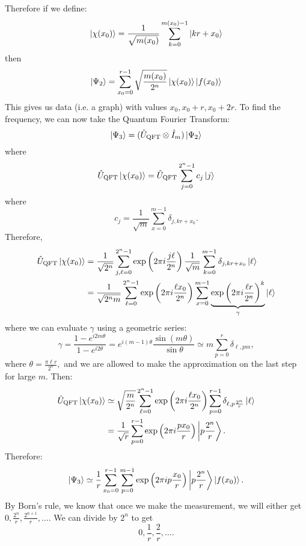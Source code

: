 \documentclass{article}
\numberwithin{equation}{section}
\begin{document}
Therefore if we define:
\begin{equation}
    \ket{\chi(x_0)} = \frac{1}{\sqrt{m(x_0)}} \sum_{k=0}^{m(x_0)-1}\ket{kr+x_0}
\end{equation}
then
\begin{equation}
    \ket{\Psi_2} = \sum_{x_0=0}^{r-1}\sqrt{\frac{m(x_0)}{2^n}}\ket{\chi(x_0)}\ket{f(x_0)}
\end{equation}
This gives us data (i.e. a graph) with values $x_0,x_0+r, x_0+2r.$ To find the frequency, we can now take the Quantum Fourier Transform:
\begin{equation}
    \ket{\Psi_3} = (\hat{U}_\text{QFT} \otimes \hat{I}_m)\ket{\Psi_2}
\end{equation}
where 
\begin{equation}
    \hat{U}_\text{QFT}\ket{\chi(x_0)} = \hat{U}_\text{QFT} \sum_{j=0}^{2^n-1} c_j \ket{j}
\end{equation}
where 
\begin{equation}
    c_j = \frac{1}{\sqrt{m}}\sum_{x=0}^{m-1} \delta_{j,kr+x_0}.
\end{equation}
Therefore,
\begin{align}
    \hat{U}_\text{QFT}\ket{\chi(x_0)} &= \frac{1}{\sqrt{2^n}} \sum_{j,\ell=0}^{2^n-1} \exp\left(2\pi i \frac{j\ell}{2^n}\right)\frac{1}{\sqrt{m}}\sum_{k=0}^{m-1} \delta_{j,kr+x_0}\ket{\ell} \\ 
    &= \frac{1}{\sqrt{2^nm}} \sum_{\ell=0}^{2^n-1} \exp\left(2\pi i \frac{\ell x_0}{2^n}\right)\sum_{x=0}^{m-1} \underbrace{\exp\left(2\pi i \frac{\ell r}{2^n}\right)^k}_{\gamma}\ket{\ell}
\end{align}
where we can evaluate $\gamma$ using a geometric series:
\begin{equation}
    \gamma = \frac{1-e^{i2m\theta}}{1-e^{i2\theta}} = e^{i(m-1)\theta}\frac{\sin(m\theta)}{\sin\theta} \simeq m\sum_{p=0}^{r} \delta_{\ell,pm},
\end{equation}
where $\theta = \frac{\pi \ell r}{2^n},$ and we are allowed to make the approximation on the last step for large $m$. Then:
\begin{align}
    \hat{U}_\text{QFT}\ket{\chi(x_0)} &\simeq \sqrt{\frac{m}{2^n}} \sum_{\ell=0}^{2^n-1} \exp\left(2\pi i \frac{\ell x_0}{2^n}\right) \sum_{p=0}^{r-1} \delta_{\ell, p \frac{2^n}{r}} \ket{\ell} \\ 
    &= \frac{1}{\sqrt{r}} \sum_{p=0}^{r-1} \exp\left(2\pi i \frac{px_0}{r}\right) \ket{p\frac{2^n}{r}}.
\end{align}
Therefore:
\begin{equation}
    \ket{\Psi_3} \simeq \frac{1}{r} \sum_{x_0=0}^{r-1} \sum_{p=0}^{m-1} \exp\left(2\pi i p \frac{x_0}{r}\right)\ket{p \frac{2^n}{r}} \ket{f(x_0)}.
\end{equation}
By Born's rule, we know that once we make the measurement, we will either get $0, \frac{2^n}{r}, \frac{2^{n+1}}{r}, \dots.$ We can divide by $2^n$ to get 
\begin{equation*}
    0, \frac{1}{r}, \frac{2}{r}, \dots.
\end{equation*}
\end{document}
